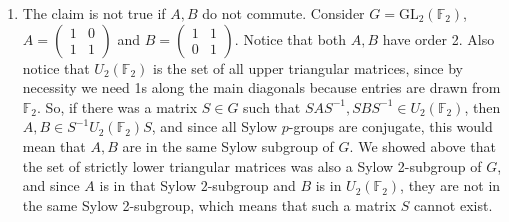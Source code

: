 \documentclass[12pt]{article}
\theoremstyle{definitionstyle}
\def\mbb#1{\mathbb{#1}}
\newcommand{\F}{\mbb F}
\begin{document}
\begin{enumerate}[leftmargin=\labelsep]
\begin{enumerate}
			\item The claim is not true if $A,B$ do not commute. Consider $G = \mathrm{GL}_2(\F_2)$, $A = \begin{pmatrix} 1 & 0 \\ 1 & 1 \end{pmatrix}$ and $B = \begin{pmatrix} 1 & 1 \\ 0 & 1 \end{pmatrix}$. Notice that both $A,B$ have order 2. Also notice that $U_2(\F_2)$ is the set of all upper triangular matrices, since by necessity we need 1s along the main diagonals because entries are drawn from $\F_2$. So, if there was a matrix $S \in G$ such that $SAS^{-1}, SBS^{-1} \in U_2(\F_2)$, then $A, B \in S^{-1}U_2(\F_2)S$, and since all Sylow $p$-groups are conjugate, this would mean that $A,B$ are in the same Sylow subgroup of $G$. We showed above that the set of strictly lower triangular matrices was also a Sylow 2-subgroup of $G$, and since $A$ is in that Sylow $2$-subgroup and $B$ is in $U_2(\F_2)$, they are not in the same Sylow 2-subgroup, which means that such a matrix $S$ cannot exist.
		\end{enumerate}
	\end{enumerate}
\end{document}
